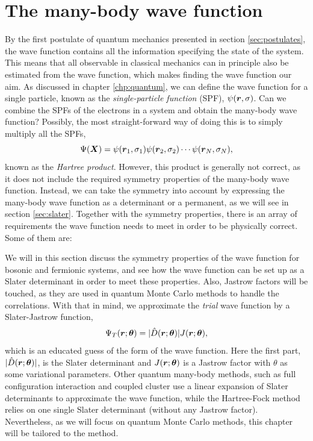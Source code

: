 \section{The many-body wave function} \label{sec:wavefunction}
By the first postulate of quantum mechanics presented in section \ref{sec:postulates}, the wave function contains all the information specifying the state of the system. This means that all observable in classical mechanics can in principle also be estimated from the wave function, which makes finding the wave function our aim. As discussed in chapter \ref{chp:quantum}, we can define the wave function for a single particle, known as the \textit{single-particle function} (SPF), $\psi(\boldsymbol{{r}},\sigma)$. Can we combine the SPFs of the electrons in a system and obtain the many-body wave function? Possibly, the most straight-forward way of doing this is to simply multiply all the SPFs,
\begin{equation}
\Psi(\boldsymbol{{X}})=\psi(\boldsymbol{{r}}_1,\sigma_1)\psi(\boldsymbol{{r}}_2,\sigma_2)\cdots\psi(\boldsymbol{{r}}_N,\sigma_N),
\end{equation}
known as the \textit{Hartree product}. However, this product is generally not correct, as it does not include the required symmetry properties of the many-body wave function. Instead, we can take the symmetry into account by expressing the many-body wave function as a determinant or a permanent, as we will see in section \ref{sec:slater}. Together with the symmetry properties, there is an array of requirements the wave function needs to meet in order to be physically correct. Some of them are:

\iffalse
We will in this section discuss the symmetry properties of the wave function for bosonic and fermionic systems, and see how the wave function can be set up as a Slater determinant in order to meet these properties. Also, Jastrow factors will be touched, as they are used in quantum Monte Carlo methods to handle the correlations. With that in mind, we approximate the \textit{trial} wave function by a Slater-Jastrow function,
\begin{equation}
\Psi_T(\boldsymbol{{r}};\boldsymbol{{\theta}})=|\hat{D}(\boldsymbol{{r}};\boldsymbol{{\theta}})|J(\boldsymbol{{r}};\boldsymbol{{\theta}}),
\end{equation}
which is an educated guess of the form of the wave function. 
Here the first part, $|\hat{D}(\boldsymbol{{r}};\boldsymbol{{\theta}})|$, is the Slater determinant and $J(\boldsymbol{{r}};\boldsymbol{{\theta}})$ is a Jastrow factor with $\theta$ as some variational parameters. Other quantum many-body methods, such as full configuration interaction and coupled cluster use a linear expansion of Slater determinants to approximate the wave function, while the Hartree-Fock method relies on one single Slater determinant (without any Jastrow factor). Nevertheless, as we will focus on quantum Monte Carlo methods, this chapter will be tailored to the method. 

